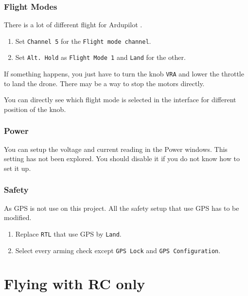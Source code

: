 \subsubsection{Flight Modes}
There is a lot of different flight for Ardupilot \cite{ardupilot_flight_modes}.
\begin{enumerate}
    \item Set \texttt{Channel 5} for the \texttt{Flight mode channel}.
    \item Set \texttt{Alt. Hold} as \texttt{Flight Mode 1} and \texttt{Land} for the other.
\end{enumerate}
If something happens, you just have to turn the knob \texttt{VRA} and lower the throttle to land the drone.
There may be a way to stop the motors directly.

You can directly see which flight mode is selected in the interface for different position of the knob.

\subsubsection{Power}
You can setup the voltage and current reading in the Power windows.
This setting has not been explored. You should disable it if you do not know how to set it up.

\subsubsection{Safety}
As GPS is not use on this project. All the safety setup that use GPS has to be modified.
\begin{enumerate}
    \item Replace \texttt{RTL} that use GPS by \texttt{Land}.
    \item Select every arming check except \texttt{GPS Lock} and \texttt{GPS Configuration}.
\end{enumerate}

\section{Flying with RC only}

